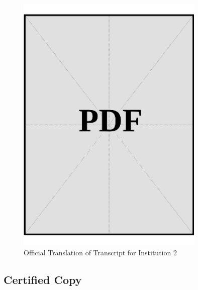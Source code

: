 \begin{figure}[h]
    \centering
    \includegraphics[page=1, width=0.8\textwidth]{../application-docs/applicant/post-secondary-institutions/institution-2/transcript/official-translations.pdf}
    \caption{Official Translation of Transcript for Institution 2}
    \label{fig:institution-2-transcript-official-translation}
\end{figure}

\vspace*{\fill}
\clearpage

\subsection*{Certified Copy}

\vspace*{\fill}

